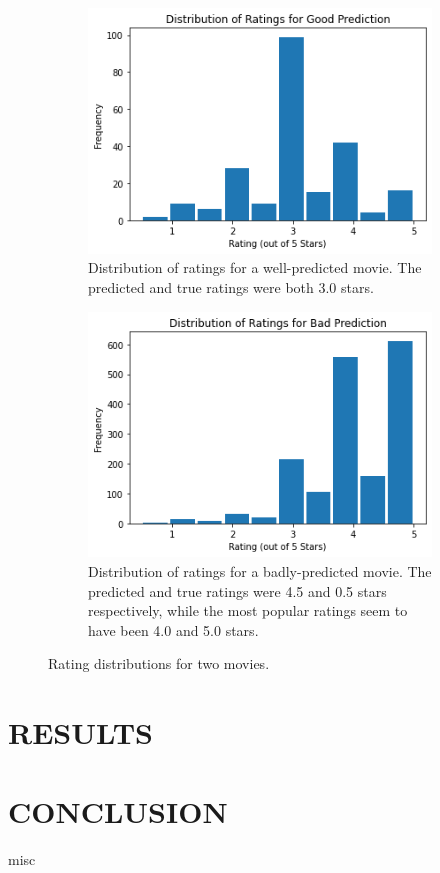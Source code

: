 \documentclass[letterpaper, 10 pt, conference]{ieeeconf}  %
\begin{document}
\begin{figure}[h]
   \begin{subfigure}[b]{\columnwidth}
      \includegraphics[width=\linewidth]{./figs/gooddist.png}
      \caption{Distribution of ratings for a well-predicted movie. The predicted and true ratings were both 3.0 stars.}
   \end{subfigure}
   \hfill
   \begin{subfigure}[b]{\columnwidth}
      \includegraphics[width=\linewidth]{./figs/baddist.png}
      \caption{Distribution of ratings for a badly-predicted movie. The predicted and true ratings were 4.5 and 0.5 stars respectively, while the most popular ratings seem to have been 4.0 and 5.0 stars.}
   \end{subfigure}
   \caption{Rating distributions for two movies.}
\end{figure}

\section{RESULTS}


\section{CONCLUSION}

\newpage
misc
\newpage


\end{document}
